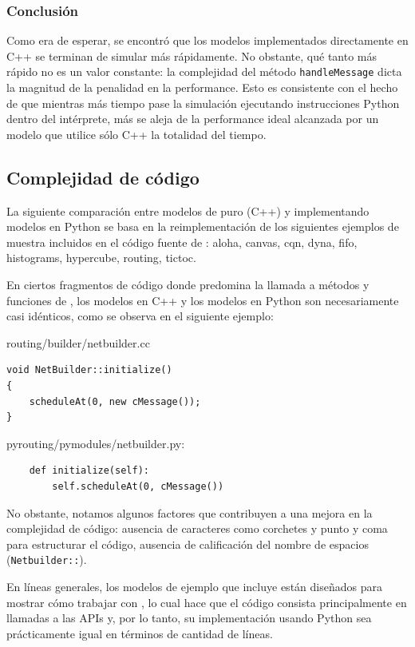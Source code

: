 \documentclass[]{article}
\begin{document}
\subsubsection{Conclusión}

Como era de esperar, se encontró que los modelos implementados directamente en
C++ se terminan de simular más rápidamente. No obstante, qué tanto más rápido
no es un valor constante: la complejidad del método \verb!handleMessage! dicta
la magnitud de la penalidad en la performance. Esto es consistente con el hecho
de que mientras más tiempo pase la simulación ejecutando instrucciones Python
dentro del intérprete, más se aleja de la performance ideal alcanzada por un
modelo que utilice sólo C++ la totalidad del tiempo.

\subsection{Complejidad de código}

La siguiente comparación entre modelos de \omnetpp{} puro (C++) y \omnetpp{}
implementando modelos en Python se basa en la reimplementación de los
siguientes ejemplos de muestra incluidos en el código fuente de \omnetpp{}: aloha,
canvas, cqn, dyna, fifo, histograms, hypercube, routing, tictoc.

En ciertos fragmentos de código donde predomina la llamada a métodos y
funciones de \omnetpp{}, los modelos en C++ y los modelos en Python son
necesariamente casi idénticos, como se observa en el siguiente ejemplo:

routing/builder/netbuilder.cc

\begin{verbatim}
void NetBuilder::initialize()
{
    scheduleAt(0, new cMessage());
}
\end{verbatim}

pyrouting/pymodules/netbuilder.py:

\begin{verbatim}
    def initialize(self):
        self.scheduleAt(0, cMessage())
\end{verbatim}

No obstante, notamos algunos factores que contribuyen a una mejora en la
complejidad de código: ausencia de caracteres como corchetes y punto y coma
para estructurar el código, ausencia de calificación del nombre de espacios
(\verb!Netbuilder::!).

En líneas generales, los modelos de ejemplo que incluye \omnetpp{} están diseñados
para mostrar cómo trabajar con \omnetpp{}, lo cual hace que el código consista
principalmente en llamadas a las APIs y, por lo tanto, su implementación usando
Python sea prácticamente igual en términos de cantidad de líneas.
\end{document}
